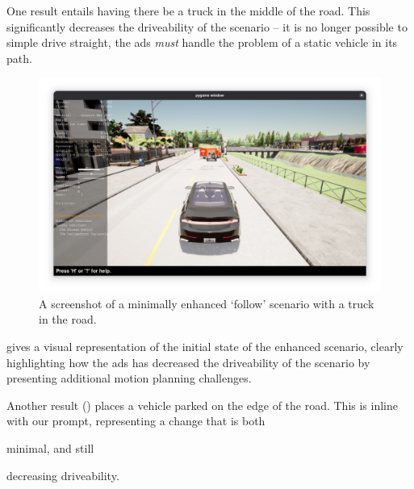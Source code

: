 One result entails having there be a truck in the middle of the road. This significantly decreases
the driveability of the scenario -- it is no longer possible to simple drive straight, the
\acrshort{ads} \emph{must} handle the problem of a static vehicle in its path.


\begin{figure}[htb]
    \centering
    \includegraphics[width=\textwidth]{experiment-material/follow-minimally-enhanced-1-startpoint.png}
    \caption{A screenshot of a minimally enhanced `follow' scenario with a truck in the road.}\label{fig:followMinimallyEnhanced1StartPoint}
\end{figure}

 gives a visual representation of the initial state of
the enhanced scenario, clearly highlighting how the \acrshort{ads} has decreased the driveability of
the scenario by presenting additional motion planning challenges.

Another result () places a vehicle parked on the edge
of the road. This is inline with our prompt, representing a change that is both \begin{inparaenum}
    \item minimal, and still
    \item decreasing driveability.
\end{inparaenum}

